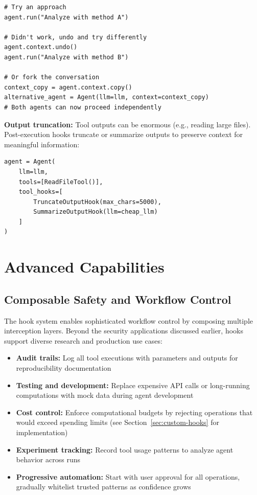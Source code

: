 \documentclass{article}
\begin{document}
\begin{verbatim}
# Try an approach
agent.run("Analyze with method A")

# Didn't work, undo and try differently
agent.context.undo()
agent.run("Analyze with method B")

# Or fork the conversation
context_copy = agent.context.copy()
alternative_agent = Agent(llm=llm, context=context_copy)
# Both agents can now proceed independently
\end{verbatim}

\textbf{Output truncation:} Tool outputs can be enormous (e.g., reading large files). Post-execution hooks truncate or summarize outputs to preserve context for meaningful information:

\begin{verbatim}
agent = Agent(
    llm=llm,
    tools=[ReadFileTool()],
    tool_hooks=[
        TruncateOutputHook(max_chars=5000),
        SummarizeOutputHook(llm=cheap_llm)
    ]
)
\end{verbatim}


\section{Advanced Capabilities}

\subsection{Composable Safety and Workflow Control}

The hook system enables sophisticated workflow control by composing multiple interception layers. Beyond the security applications discussed earlier, hooks support diverse research and production use cases:

\begin{itemize}
    \item \textbf{Audit trails:} Log all tool executions with parameters and outputs for reproducibility documentation
    \item \textbf{Testing and development:} Replace expensive API calls or long-running computations with mock data during agent development
    \item \textbf{Cost control:} Enforce computational budgets by rejecting operations that would exceed spending limits (see Section~\ref{sec:custom-hooks} for implementation)
    \item \textbf{Experiment tracking:} Record tool usage patterns to analyze agent behavior across runs
    \item \textbf{Progressive automation:} Start with user approval for all operations, gradually whitelist trusted patterns as confidence grows
\end{itemize}
\end{document}
